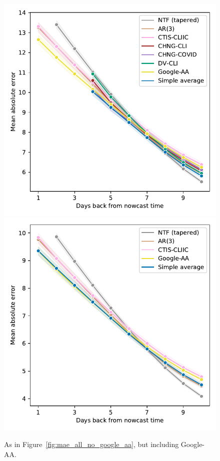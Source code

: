 \documentclass[sts]{imsart}
\theoremstyle{plain}
\theoremstyle{definition}
\theoremstyle{remark}
\begin{document}
\begin{appendix}
\begin{figure}[tb]
\centering
\includegraphics[width=0.85\linewidth]{./figures/lineplot_claims.pdf}
\includegraphics[width=0.85\linewidth]{./figures/lineplot_no_claims.pdf}
\caption{As in Figure~\ref{fig:mae_all_no_google_aa}, but including Google-AA.}    
\label{fig:mae_all}
\end{figure}


\end{appendix}
\end{document}
